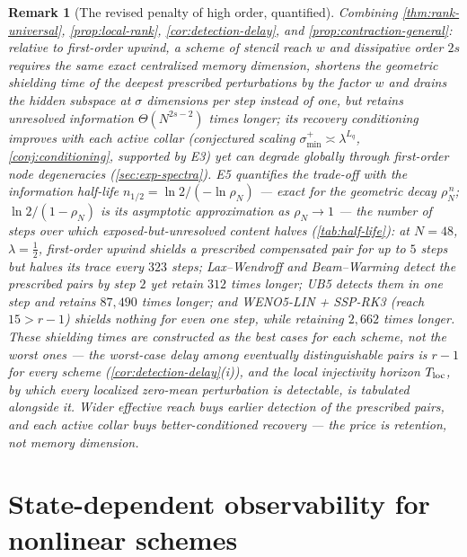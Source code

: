 \documentclass[pdflatex,sn-mathphys-num]{sn-jnl}%
\theoremstyle{thmstyleone}%
\theoremstyle{thmstyletwo}%
\newtheorem{remark}{Remark}%
\theoremstyle{thmstylethree}%
\begin{document}
\begin{remark}[The revised penalty of high order, quantified]\label{rem:double-penalty}
Combining \cref{thm:rank-universal}, \cref{prop:local-rank}, \cref{cor:detection-delay}, and \cref{prop:contraction-general}: relative to first-order upwind, a scheme of stencil reach $w$ and dissipative order $2s$ requires the \emph{same} exact centralized memory dimension, shortens the geometric shielding time of the deepest prescribed perturbations by the factor $w$ and drains the hidden subspace at $\sigma$ dimensions per step instead of one, but retains unresolved information $\Theta(N^{2s-2})$ times longer; its recovery conditioning improves with each active collar (conjectured scaling $\sigma^{+}_{\min}\asymp\lambda^{L_q}$, \cref{conj:conditioning}, supported by E3) yet can degrade globally through first-order node degeneracies (\cref{sec:exp-spectra}).
E5 quantifies the trade-off with the \emph{information half-life} $n_{1/2}=\ln2/(-\ln\rho_N)$ --- exact for the geometric decay $\rho_N^{\,n}$; $\ln2/(1-\rho_N)$ is its asymptotic approximation as $\rho_N\to1$ --- the number of steps over which exposed-but-unresolved content halves (\cref{tab:half-life}): at $N=48$, $\lambda=\tfrac12$, first-order upwind shields a prescribed compensated pair for up to $5$ steps but halves its trace every $323$ steps; Lax--Wendroff and Beam--Warming detect the prescribed pairs by step $2$ yet retain $312$ times longer; UB5 detects them in one step and retains $87{,}490$ times longer; and WENO5-LIN + SSP-RK3 (reach $15>r-1$) shields nothing for even one step, while retaining $2{,}662$ times longer.
These shielding times are constructed as the best cases for each scheme, not the worst ones --- the worst-case delay among eventually distinguishable pairs is $r-1$ for every scheme (\cref{cor:detection-delay}(i)), and the local injectivity horizon $T_{\rm loc}$, by which \emph{every} localized zero-mean perturbation is detectable, is tabulated alongside it.
Wider effective reach buys earlier detection of the prescribed pairs, and each active collar buys better-conditioned recovery --- the price is retention, not memory dimension.
\end{remark}

\section{State-dependent observability for nonlinear schemes}\label{sec:nonlinear}
\end{document}
